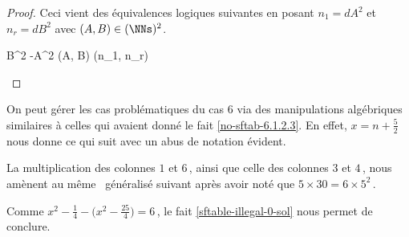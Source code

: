 \begin{proof}
	Ceci vient des équivalences logiques suivantes en posant $n_1 = d A^2$ et $n_r = d B^2$ avec $(A, B) \in ( \NNs )^2$.
	
	\medskip
	\begin{stepcalc}[style=ar*, ope={\iff}]
		 \in {}
	\explnext{}
		B^2 -A^2 \in {}
		(A, B) \in {}
	\explnext{}
		(n_1, n_r) \in {}
	\end{stepcalc}

	\vspace{-2ex}	
	\leavevmode
\end{proof}


\begin{remark}
	On peut gérer les cas problématiques du cas $6$ via des manipulations algébriques similaires à celles qui avaient donné le fait \ref{no-sftab-6.1.2.3}.
	En effet, $x = n + \frac52$ nous donne ce qui suit avec un abus de notation évident.
	\begin{center}
	\end{center}
	
	La multiplication des colonnes $1$ et $6$\,, ainsi que celle des colonnes $3$ et $4$\,, nous amènent au même \sftab\ généralisé suivant après avoir noté que $5 \times 30 = 6 \times 5^2$\,.
	\begin{center}
	\end{center}
	
	
	Comme $x^2 - \frac14 - \big( x^2 - \frac{25}{4} \big) = 6$\,, le fait \ref{sftable-illegal-0-sol} nous permet de conclure.
\end{remark}

